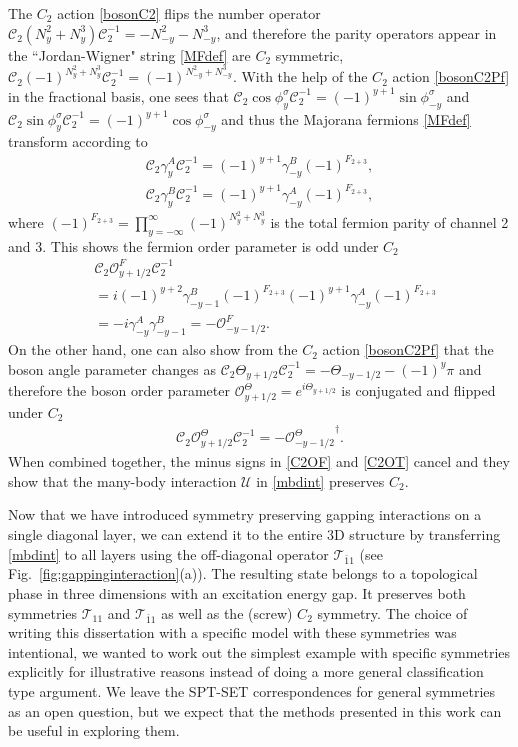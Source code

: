 The $C_2$ action \eqref{bosonC2} flips the number operator $\mathcal{C}_2(N_y^2+N_y^3)\mathcal{C}_2^{-1}=-N_{-y}^2-N_{-y}^3$, and therefore the parity operators appear in the ``Jordan-Wigner" string \eqref{MFdef} are $C_2$ symmetric, $\mathcal{C}_2(-1)^{N_y^2+N_y^3}\mathcal{C}_2^{-1}=(-1)^{N_{-y}^2+N_{-y}^3}$. With the help of the $C_2$ action \eqref{bosonC2Pf} in the fractional basis, one sees that $\mathcal{C}_2\cos\phi^\sigma_y\mathcal{C}_2^{-1}=(-1)^{y+1}\sin\phi^\sigma_{-y}$ and $\mathcal{C}_2\sin\phi^\sigma_y\mathcal{C}_2^{-1}=(-1)^{y+1}\cos\phi^\sigma_{-y}$ and thus the Majorana fermions \eqref{MFdef} transform according to \begin{align}\mathcal{C}_2\gamma^A_y\mathcal{C}_2^{-1}=(-1)^{y+1}\gamma^B_{-y}(-1)^{F_{2+3}},\\\mathcal{C}_2\gamma^B_y\mathcal{C}_2^{-1}=(-1)^{y+1}\gamma^A_{-y}(-1)^{F_{2+3}},\nonumber\end{align} where $(-1)^{F_{2+3}}=\prod_{y=-\infty}^\infty(-1)^{N_y^2+N_y^3}$ is the total fermion parity of channel 2 and 3. This shows the fermion order parameter is odd under $C_2$ \begin{align}&\mathcal{C}_2\mathcal{O}^F_{y+1/2}\mathcal{C}_2^{-1}\nonumber\\&=i(-1)^{y+2}\gamma^B_{-y-1}(-1)^{F_{2+3}}(-1)^{y+1}\gamma^A_{-y}(-1)^{F_{2+3}}\nonumber\\&=-i\gamma^A_{-y}\gamma^B_{-y-1}=-\mathcal{O}^F_{-y-1/2}.\label{C2OF}\end{align} On the other hand, one can also show from the $C_2$ action \eqref{bosonC2Pf} that the boson angle parameter changes as $\mathcal{C}_2\Theta_{y+1/2}\mathcal{C}_2^{-1}=-\Theta_{-y-1/2}-(-1)^y\pi$ and therefore the boson order parameter $\mathcal{O}^\Theta_{y+1/2}=e^{i\Theta_{y+1/2}}$ is conjugated and flipped under $C_2$ \begin{align}\mathcal{C}_2\mathcal{O}^\Theta_{y+1/2}\mathcal{C}_2^{-1}=-{\mathcal{O}^\Theta_{-y-1/2}}^\dagger.\label{C2OT}\end{align} When combined together, the minus signs in \eqref{C2OF} and \eqref{C2OT} cancel and they show that the many-body interaction $\mathcal{U}$ in \eqref{mbdint} preserves $C_2$.

Now that we have introduced symmetry preserving gapping interactions on a single diagonal layer, we can extend it to the entire 3D structure by transferring \eqref{mbdint} to all layers using the off-diagonal \AFTR operator $\mathcal{T}_{\bar{1}1}$ (see Fig.~\ref{fig:gappinginteraction}(a)). The resulting state belongs to a topological phase in three dimensions with an excitation energy gap. It preserves both \AFTR symmetries $\mathcal{T}_{11}$ and $\mathcal{T}_{\bar{1}1}$ as well as the (screw) $C_2$ symmetry. The choice of writing this dissertation with a specific model with these symmetries was intentional, we wanted to work out the simplest example with specific symmetries explicitly for illustrative reasons instead of doing a more general classification type argument. We leave the SPT-SET correspondences for general symmetries as an open question, but we expect that the methods presented in this work can be useful in exploring them.


